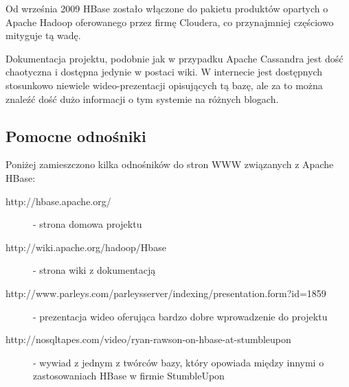 Od września 2009 HBase zostało włączone do pakietu produktów opartych o Apache Hadoop oferowanego przez firmę Cloudera, co przynajmniej częściowo mityguje tą wadę.

Dokumentacja projektu, podobnie jak w przypadku Apache Cassandra jest dość chaotyczna i dostępna jedynie w postaci wiki.
W internecie jest dostępnych stosunkowo niewiele wideo-prezentacji opisujących tą bazę, ale za to można znaleźć dość dużo informacji o tym systemie na różnych blogach.

\subsection*{Pomocne odnośniki}

Poniżej zamieszczono kilka odnośników do stron WWW związanych z Apache HBase:

\begin{description}
 \item [http://hbase.apache.org/] - strona domowa projektu
 \item [http://wiki.apache.org/hadoop/Hbase] - strona wiki z dokumentacją
 \item [http://www.parleys.com/parleysserver/indexing/presentation.form?id=1859] - prezentacja wideo oferująca bardzo dobre wprowadzenie do projektu
 \item [http://nosqltapes.com/video/ryan-rawson-on-hbase-at-stumbleupon] - wywiad z jednym z twórców bazy, który opowiada między innymi o zastosowaniach HBase w firmie StumbleUpon
\end{description}
